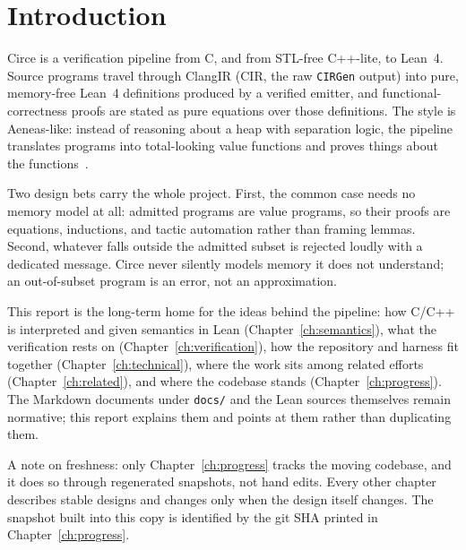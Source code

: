 \chapter{Introduction}
\label{ch:intro}

Circe is a verification pipeline from C, and from STL-free C++-lite, to
Lean~4. Source programs travel through ClangIR (CIR, the raw
\texttt{CIRGen} output) into pure, memory-free Lean~4 definitions produced
by a verified emitter, and functional-correctness proofs are stated as pure
equations over those definitions. The style is Aeneas-like: instead of
reasoning about a heap with separation logic, the pipeline translates
programs into total-looking value functions and proves things about the
functions~\cite{aeneas-site}.

Two design bets carry the whole project. First, the common case needs no
memory model at all: admitted programs are value programs, so their proofs
are equations, inductions, and tactic automation rather than framing
lemmas. Second, whatever falls outside the admitted subset is rejected
loudly with a dedicated message. Circe never silently models memory it
does not understand; an out-of-subset program is an error, not an
approximation.

This report is the long-term home for the ideas behind the pipeline: how
C/C++ is interpreted and given semantics in Lean
(Chapter~\ref{ch:semantics}), what the verification rests on
(Chapter~\ref{ch:verification}), how the repository and harness fit
together (Chapter~\ref{ch:technical}), where the work sits among related
efforts (Chapter~\ref{ch:related}), and where the codebase stands
(Chapter~\ref{ch:progress}). The Markdown documents under
\texttt{docs/} and the Lean sources themselves remain normative; this
report explains them and points at them rather than duplicating them.

A note on freshness: only Chapter~\ref{ch:progress} tracks the moving
codebase, and it does so through regenerated snapshots, not hand edits.
Every other chapter describes stable designs and changes only when the
design itself changes. The snapshot built into this copy is identified by
the git SHA printed in Chapter~\ref{ch:progress}.
